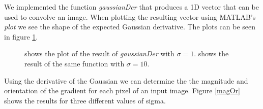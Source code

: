 \documentclass[a4paper]{article}
\begin{document}
We implemented the function \emph{gaussianDer} that produces a 1D vector that can be used to convolve an image. When plotting the resulting vector using MATLAB's \emph{plot} we see the shape of the expected Gaussian derivative. The plots can be seen in figure \ref{gaussDer}.

\begin{figure}[H]
  \centering
  \caption{ shows the plot of the result of \emph{gaussianDer} with $\sigma = 1$.  shows the result of the same function with $\sigma = 10$. }
  \label{gaussDer}
\end{figure}

Using the derivative of the Gaussian we can determine the the magnitude and orientation of the gradient for each pixel of an input image. Figure \ref{magOr} shows the results for three different values of sigma. 
\end{document}
